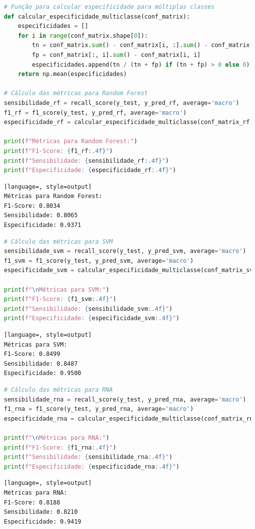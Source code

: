 \begin{lstlisting}[language=Python, style=input]
# Função para calcular especificidade para múltiplas classes
def calcular_especificidade_multiclasse(conf_matrix):
    especificidades = []
    for i in range(conf_matrix.shape[0]):
        tn = conf_matrix.sum() - conf_matrix[i, :].sum() - conf_matrix[:, i].sum() + conf_matrix[i, i]
        fp = conf_matrix[:, i].sum() - conf_matrix[i, i]
        especificidades.append(tn / (tn + fp) if (tn + fp) > 0 else 0)
    return np.mean(especificidades)

# Cálculo das métricas para Random Forest
sensibilidade_rf = recall_score(y_test, y_pred_rf, average='macro')
f1_rf = f1_score(y_test, y_pred_rf, average='macro')
especificidade_rf = calcular_especificidade_multiclasse(conf_matrix_rf)

print(f"Métricas para Random Forest:")
print(f"F1-Score: {f1_rf:.4f}")
print(f"Sensibilidade: {sensibilidade_rf:.4f}")
print(f"Especificidade: {especificidade_rf:.4f}")
\end{lstlisting}
\begin{lstlisting}[language=, style=output]
Métricas para Random Forest:
F1-Score: 0.8034
Sensibilidade: 0.8065
Especificidade: 0.9371
\end{lstlisting}
\begin{lstlisting}[language=Python, style=input]
# Cálculo das métricas para SVM
sensibilidade_svm = recall_score(y_test, y_pred_svm, average='macro')
f1_svm = f1_score(y_test, y_pred_svm, average='macro')
especificidade_svm = calcular_especificidade_multiclasse(conf_matrix_svm)

print(f"\nMétricas para SVM:")
print(f"F1-Score: {f1_svm:.4f}")
print(f"Sensibilidade: {sensibilidade_svm:.4f}")
print(f"Especificidade: {especificidade_svm:.4f}")
\end{lstlisting}
\begin{lstlisting}[language=, style=output]
Métricas para SVM:
F1-Score: 0.8499
Sensibilidade: 0.8487
Especificidade: 0.9500
\end{lstlisting}
\begin{lstlisting}[language=Python, style=input]
# Cálculo das métricas para RNA
sensibilidade_rna = recall_score(y_test, y_pred_rna, average='macro')
f1_rna = f1_score(y_test, y_pred_rna, average='macro')
especificidade_rna = calcular_especificidade_multiclasse(conf_matrix_rna)

print(f"\nMétricas para RNA:")
print(f"F1-Score: {f1_rna:.4f}")
print(f"Sensibilidade: {sensibilidade_rna:.4f}")
print(f"Especificidade: {especificidade_rna:.4f}")
\end{lstlisting}
\begin{lstlisting}[language=, style=output]
Métricas para RNA:
F1-Score: 0.8188
Sensibilidade: 0.8210
Especificidade: 0.9419
\end{lstlisting}

